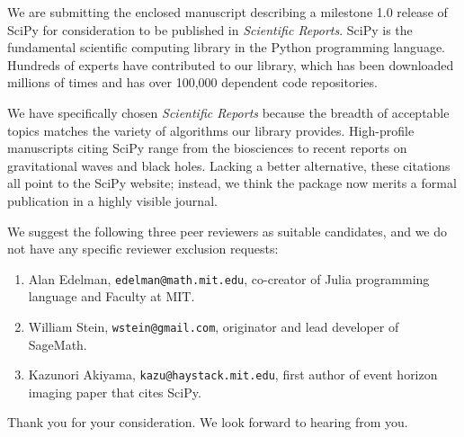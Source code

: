 \documentclass[10pt,stdletter,dateno]{newlfm}
\begin{document}
\begin{newlfm}

We are submitting the enclosed manuscript describing a milestone
1.0 release of SciPy for consideration to be published in
\emph{Scientific Reports}. SciPy is the fundamental scientific 
computing library in the Python programming language. 
Hundreds of experts have contributed to our library, which
has been downloaded millions of times and has over 100,000 dependent
code repositories.

We have specifically chosen \emph{Scientific Reports} because
the breadth of acceptable topics matches the variety of algorithms
our library provides. High-profile manuscripts citing SciPy range
from the biosciences to recent reports on gravitational waves and
black holes. Lacking a better alternative, these citations all point
to the SciPy website; instead, we think the package now merits a
formal publication in a highly visible journal.

We suggest the following three peer reviewers as suitable candidates,
and we do not have any specific reviewer exclusion requests:

\begin{enumerate}
    \item Alan Edelman, \texttt{edelman@math.mit.edu}, co-creator of Julia
    programming language and Faculty at MIT.
    \item William Stein, \texttt{wstein@gmail.com}, originator and
    lead developer of SageMath.
    \item Kazunori Akiyama, \texttt{kazu@haystack.mit.edu}, first author
    of event horizon imaging paper that cites SciPy.
\end{enumerate}

Thank you for your consideration.  We look forward to
hearing from you.

\end{newlfm}
\end{document}
